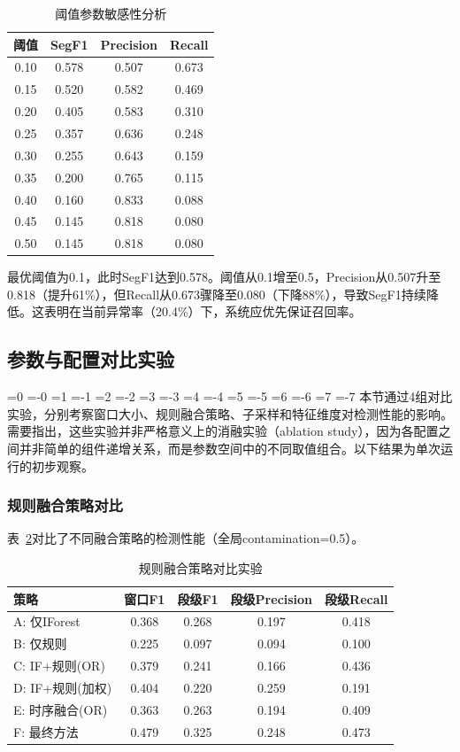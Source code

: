\documentclass[12pt, a4paper]{article}
\newcommand{\zihao}[1]{%
    \ifnum#1=0 {\fontsize{42pt}{50pt}\selectfont}%
    \else\ifnum#1=-0 {\fontsize{36pt}{44pt}\selectfont}%
    \else\ifnum#1=1 {\fontsize{26pt}{32pt}\selectfont}%
    \else\ifnum#1=-1 {\fontsize{24pt}{28pt}\selectfont}%
    \else\ifnum#1=2 {\fontsize{22pt}{26pt}\selectfont}%
    \else\ifnum#1=-2 {\fontsize{18pt}{22pt}\selectfont}%
    \else\ifnum#1=3 {\fontsize{16pt}{20pt}\selectfont}%
    \else\ifnum#1=-3 {\fontsize{15pt}{18pt}\selectfont}%
    \else\ifnum#1=4 {\fontsize{14pt}{17pt}\selectfont}%
    \else\ifnum#1=-4 {\fontsize{12pt}{15pt}\selectfont}%
    \else\ifnum#1=5 {\fontsize{10.5pt}{13pt}\selectfont}%
    \else\ifnum#1=-5 {\fontsize{9pt}{11pt}\selectfont}%
    \else\ifnum#1=6 {\fontsize{7.5pt}{9pt}\selectfont}%
    \else\ifnum#1=-6 {\fontsize{6.5pt}{8pt}\selectfont}%
    \else\ifnum#1=7 {\fontsize{5.5pt}{7pt}\selectfont}%
    \else\ifnum#1=-7 {\fontsize{5pt}{6pt}\selectfont}%
    \fi\fi\fi\fi\fi\fi\fi\fi\fi\fi\fi\fi\fi\fi\fi\fi
}
\newcommand{\songti}{\CJKfontspec{SimSun}}
\begin{document}
\begin{table}[H]
\centering
\caption{阈值参数敏感性分析}
\label{tab:threshold}
\begin{tabular}{cccc}
\toprule
阈值 & SegF1 & Precision & Recall \\
\midrule
0.10 & 0.578 & 0.507 & 0.673 \\
0.15 & 0.520 & 0.582 & 0.469 \\
0.20 & 0.405 & 0.583 & 0.310 \\
0.25 & 0.357 & 0.636 & 0.248 \\
0.30 & 0.255 & 0.643 & 0.159 \\
0.35 & 0.200 & 0.765 & 0.115 \\
0.40 & 0.160 & 0.833 & 0.088 \\
0.45 & 0.145 & 0.818 & 0.080 \\
0.50 & 0.145 & 0.818 & 0.080 \\
\bottomrule
\end{tabular}
\end{table}

最优阈值为0.1，此时SegF1达到0.578。阈值从0.1增至0.5，Precision从0.507升至0.818（提升61\%），但Recall从0.673骤降至0.080（下降88\%），导致SegF1持续降低。这表明在当前异常率（20.4\%）下，系统应优先保证召回率。

\subsection{参数与配置对比实验}

\zihao{5}\songti
本节通过4组对比实验，分别考察窗口大小、规则融合策略、子采样和特征维度对检测性能的影响。需要指出，这些实验并非严格意义上的消融实验（ablation study），因为各配置之间并非简单的组件递增关系，而是参数空间中的不同取值组合。以下结果为单次运行的初步观察。

\subsubsection{规则融合策略对比}

表~\ref{tab:rule_fallback}对比了不同融合策略的检测性能（全局contamination=0.5）。

\begin{table}[H]
\centering
\caption{规则融合策略对比实验}
\label{tab:rule_fallback}
\begin{tabular}{lcccc}
\toprule
策略 & 窗口F1 & 段级F1 & 段级Precision & 段级Recall \\
\midrule
A: 仅IForest & 0.368 & 0.268 & 0.197 & 0.418 \\
B: 仅规则 & 0.225 & 0.097 & 0.094 & 0.100 \\
C: IF+规则(OR) & 0.379 & 0.241 & 0.166 & 0.436 \\
D: IF+规则(加权) & 0.404 & 0.220 & 0.259 & 0.191 \\
E: 时序融合(OR) & 0.363 & 0.263 & 0.194 & 0.409 \\
F: 最终方法 & 0.479 & 0.325 & 0.248 & 0.473 \\
\bottomrule
\end{tabular}
\end{table}
\end{document}
